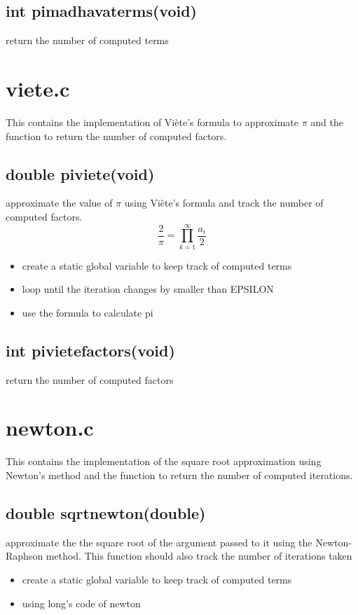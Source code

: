 \documentclass{article}
\begin{document}
\subsection{int pi\textunderscore madhava\textunderscore terms(void) }
return the number of computed terms
\section{viete.c}
This contains the implementation of Viète’s formula to approximate $\pi$ and the function to return the number of computed factors.
\subsection{double pi\textunderscore viete(void)}
approximate the value of $\pi$ using Viète’s formula and track the number of computed factors.
\[ \frac{2}{\pi} = \prod\limits_{k = 1}^{\infty} \frac{a_{i}}{2}\]
\begin{itemize} 
\item create a static global variable to keep track of computed terms
\item loop until the iteration changes by smaller than EPSILON
\item use the formula to calculate pi
\end{itemize}

\subsection{int pi\textunderscore viete\textunderscore factors(void)}
return the number of computed factors
\section{newton.c}
This contains the implementation of the square root approximation using Newton’s method and the function to return the number of computed iterations.
\subsection{double sqrt\textunderscore newton(double)}
approximate the the square root of the argument passed to it using the Newton-Raphson method. This function should also track the number of iterations taken


\begin{itemize}
\item create a static global variable to keep track of computed terms
\item using long's code of newton
\end{itemize}
\end{document}
